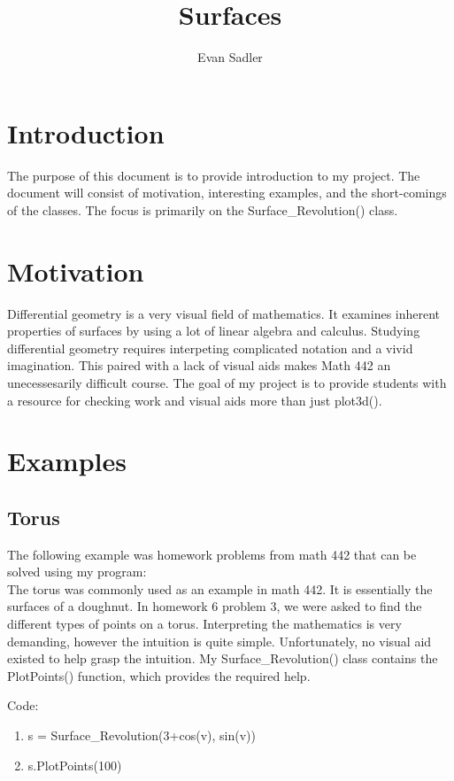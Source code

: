 \documentclass{article}
\title{Surfaces}
\author{Evan Sadler}
\begin{document}
\maketitle

\section{Introduction}
The purpose of this document is to provide introduction to my project. The document will consist of motivation, interesting examples, and the short-comings of the classes. The focus is primarily on the Surface_Revolution() class. 


\section{Motivation}
Differential geometry is a very visual field of mathematics. It examines inherent properties of surfaces by using a lot of linear algebra and calculus. Studying differential geometry requires interpeting complicated notation and a vivid imagination. This paired with a lack of visual aids makes Math 442 an unecessesarily difficult course. The goal of my project is to provide students with a resource for checking work and visual aids more than just plot3d(). 

\section{Examples}

\subsection{Torus}
The following example was homework problems from math 442 that can be solved using my program: \\

The torus was commonly used as an example in math 442. It is essentially the surfaces of a doughnut. In homework 6 problem 3, we were asked to find the different types of points on a torus. Interpreting the mathematics is very demanding, however the intuition is quite simple. Unfortunately, no visual aid existed to help grasp the intuition. My Surface\_Revolution() class contains the PlotPoints() function, which provides the required help.

Code: 
\begin{enumerate}
\item s = Surface\_Revolution(3+cos(v), sin(v))
\item s.PlotPoints(100)
\end{enumerate} 
\end{document}
